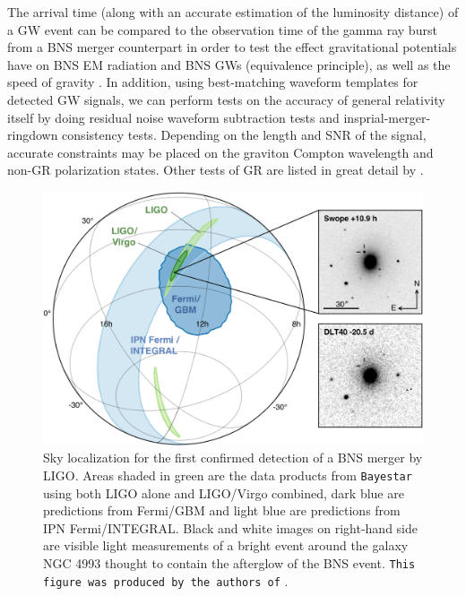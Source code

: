 %
%
The arrival time (along with an accurate 
estimation of the luminosity distance) of a \ac{GW} event 
can be compared to the observation time of the gamma ray burst from a 
\ac{BNS} merger counterpart in order to test the effect gravitational 
potentials have on \ac{BNS} \ac{EM} radiation and \ac{BNS} \ac{GW}s 
(equivalence principle), as well as the speed of 
gravity \cite{2017arXiv171005834L}. In addition, using best-matching 
waveform templates for detected \ac{GW} signals, we can perform 
tests on the accuracy of general relativity itself by doing residual 
noise waveform subtraction tests and insprial-merger-ringdown consistency 
tests. Depending on the length and \ac{SNR} of the signal, accurate 
constraints may be placed on the graviton Compton wavelength and 
non-\ac{GR} polarization states. Other tests of \ac{GR} are 
listed in great detail by \cite{PhysRevLett.116.221101}.


%
%

\begin{figure}
    \centering
    \includegraphics[width=\linewidth]{figures/GW170817_skymap.jpg}
    \caption[Sky localization for the first confirmed detection of a \ac{BNS} merger by \ac{LIGO}.]{Sky localization for the first confirmed detection of a \ac{BNS} merger by \ac{LIGO}. Areas shaded in green are the data products from \texttt{Bayestar} using both \ac{LIGO} alone and \ac{LIGO}/Virgo combined, dark blue are predictions from Fermi/GBM and light blue are predictions from IPN Fermi/INTEGRAL. Black and white images on right-hand side are visible light measurements of a bright event around the galaxy NGC 4993 thought to contain the afterglow of the \ac{BNS} event. \texttt{This figure was produced by the authors of} \cite{2017arXiv171005833L}. }
    \label{fig:GW170817_skylocalization}
\end{figure}

